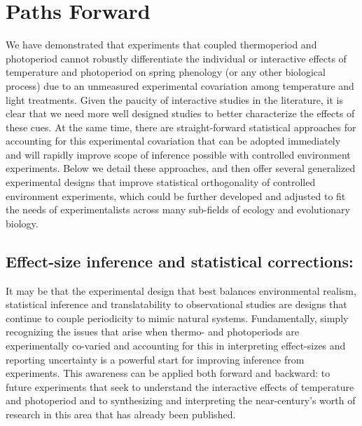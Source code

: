 \documentclass[11pt]{article}
\begin{document}
\section*{Paths Forward}
We have demonstrated that experiments that coupled thermoperiod and photoperiod cannot robustly differentiate the individual or interactive effects of temperature and photoperiod on spring phenology (or any other biological process) due to an unmeasured experimental covariation among temperature and light treatments. Given the paucity of interactive studies in the literature, it is clear that we need more well designed studies to better characterize the effects of these cues. At the same time, there are straight-forward statistical approaches for accounting for this experimental covariation that can be adopted immediately and will rapidly improve scope of inference possible with controlled environment experiments. Below we detail these approaches, and then offer several generalized experimental designs that improve statistical orthogonality of controlled environment experiments, which could be further developed and adjusted to fit the needs of experimentalists across many sub-fields of ecology and evolutionary biology. 

\subsection*{Effect-size inference and statistical corrections:}
It may be that the experimental design that best balances environmental realism, statistical inference and translatability to observational studies are designs that continue to couple periodicity to mimic natural systems. Fundamentally, simply recognizing the issues that arise when thermo- and photoperiods are experimentally co-varied and accounting for this in interpreting effect-sizes and reporting uncertainty is a powerful start for improving inference from experiments. This awareness can be applied both forward and backward: to future experiments that seek to understand the interactive effects of temperature and photoperiod and to synthesizing and interpreting the near-century's worth of research in this area that has already been published.
\end{document}
